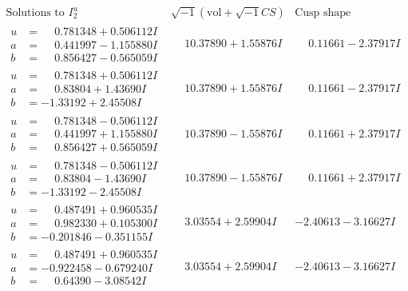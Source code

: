 \documentclass[1p]{elsarticle_modified}
\theoremstyle{definition}
\newcommand{\I}{\sqrt{-1}}
\begin{document}
$$\begin{array}{c|c|c}  
\text{Solutions to }I^u_{2}& \I (\text{vol} + \sqrt{-1}CS) & \text{Cusp shape}\\
 \hline 
\begin{aligned}
u &= \phantom{-}0.781348 + 0.506112 I \\
a &= \phantom{-}0.441997 - 1.155880 I \\
b &= \phantom{-}0.856427 - 0.565059 I\end{aligned}
 & \phantom{-}10.37890 + 1.55876 I & \phantom{-}0.11661 - 2.37917 I \\ \hline\begin{aligned}
u &= \phantom{-}0.781348 + 0.506112 I \\
a &= \phantom{-}0.83804 + 1.43690 I \\
b &= -1.33192 + 2.45508 I\end{aligned}
 & \phantom{-}10.37890 + 1.55876 I & \phantom{-}0.11661 - 2.37917 I \\ \hline\begin{aligned}
u &= \phantom{-}0.781348 - 0.506112 I \\
a &= \phantom{-}0.441997 + 1.155880 I \\
b &= \phantom{-}0.856427 + 0.565059 I\end{aligned}
 & \phantom{-}10.37890 - 1.55876 I & \phantom{-}0.11661 + 2.37917 I \\ \hline\begin{aligned}
u &= \phantom{-}0.781348 - 0.506112 I \\
a &= \phantom{-}0.83804 - 1.43690 I \\
b &= -1.33192 - 2.45508 I\end{aligned}
 & \phantom{-}10.37890 - 1.55876 I & \phantom{-}0.11661 + 2.37917 I \\ \hline\begin{aligned}
u &= \phantom{-}0.487491 + 0.960535 I \\
a &= \phantom{-}0.982330 + 0.105300 I \\
b &= -0.201846 - 0.351155 I\end{aligned}
 & \phantom{-}3.03554 + 2.59904 I & -2.40613 - 3.16627 I \\ \hline\begin{aligned}
u &= \phantom{-}0.487491 + 0.960535 I \\
a &= -0.922458 - 0.679240 I \\
b &= \phantom{-}0.64390 - 3.08542 I\end{aligned}
 & \phantom{-}3.03554 + 2.59904 I & -2.40613 - 3.16627 I \\ \hline\begin{aligned}

\end{aligned}
\end{array}$$
\end{document}
